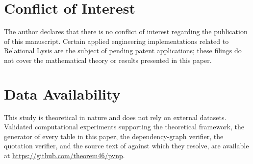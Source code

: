 \documentclass[pdflatex,sn-mathphys-num]{sn-jnl}
\theoremstyle{thmstyleone}%
\theoremstyle{thmstyletwo}%
\theoremstyle{thmstylethree}%
\newcommand{\PA}{\cite{Swanagon2026PA}}
\begin{document}
\FloatBarrier
\clearpage
\section*{Conflict of Interest}
The author declares that there is no conflict of interest regarding the publication of this manuscript. Certain applied engineering implementations related to Relational Lysis are the subject of pending patent applications; these filings do not cover the mathematical theory or results presented in this paper.

\section*{Data Availability}
This study is theoretical in nature and does not rely on external datasets. Validated computational experiments supporting the theoretical framework, the generator of every table in this paper, the dependency-graph verifier, the quotation verifier, and the source text of \PA{} against which they resolve, are available at \url{https://github.com/theorem46/pvnp}.



\ifsnjnl

\else


\fi
\end{document}
